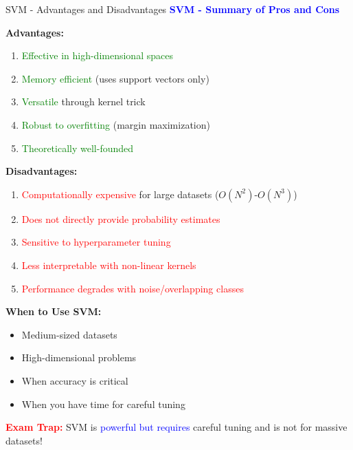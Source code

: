 \documentclass[8pt]{beamer}
\begin{document}
	\begin{frame}{SVM - Advantages and Disadvantages}
		\fontsize{6.5}{7.5}\selectfont
		\textcolor{blue}{\textbf{SVM - Summary of Pros and Cons}}
		
		\textbf{Advantages:}
		\begin{enumerate}
			\item \textcolor{green}{Effective in high-dimensional spaces}
			\item \textcolor{green}{Memory efficient} (uses support vectors only)
			\item \textcolor{green}{Versatile} through kernel trick
			\item \textcolor{green}{Robust to overfitting} (margin maximization)
			\item \textcolor{green}{Theoretically well-founded}
		\end{enumerate}
		
		\textbf{Disadvantages:}
		\begin{enumerate}
			\item \textcolor{red}{Computationally expensive} for large datasets ($O(N^2)$-$O(N^3)$)
			\item \textcolor{red}{Does not directly provide probability estimates}
			\item \textcolor{red}{Sensitive to hyperparameter tuning}
			\item \textcolor{red}{Less interpretable with non-linear kernels}
			\item \textcolor{red}{Performance degrades with noise/overlapping classes}
		\end{enumerate}
		
		\textbf{When to Use SVM:}
		\begin{itemize}
			\item Medium-sized datasets
			\item High-dimensional problems
			\item When accuracy is critical
			\item When you have time for careful tuning
		\end{itemize}
		
		\textcolor{red}{\textbf{Exam Trap:}} SVM is \textcolor{blue}{powerful but requires} careful tuning and is not for massive datasets!
	\end{frame}
	
	
\end{document}
